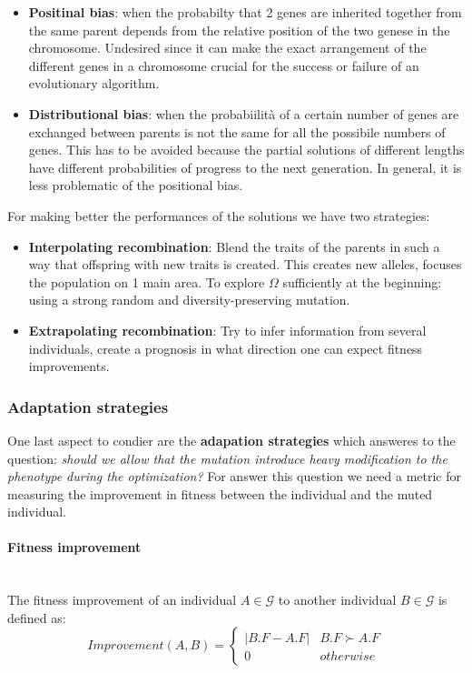 \documentclass{article}
\begin{document}
\begin{itemize}
    \item \textbf{Positinal bias}: when the probabilty that 2 genes are inherited
          together from the same parent depends from the relative position of the two
          genese in the chromosome. Undesired since it can make the exact arrangement of
          the different genes in a chromosome crucial for the
          success or failure of an evolutionary algorithm.

    \item \textbf{Distributional bias}: when the probabiilità of a certain number of
          genes are exchanged between parents is not the same for all the possibile numbers of genes.
          This has to be avoided because the partial solutions of different lengths have
          different probabilities of progress to the next generation. In general, it is less
          problematic of the positional bias.
\end{itemize}
For making better the performances of the solutions we have two strategies:
\begin{itemize}
    \item \textbf{Interpolating recombination}: Blend the traits of the parents in such
          a way that offspring with new traits is created. This creates new alleles, focuses
          the population on 1 main area. To explore $\Omega$ sufficiently at the beginning:
          using a strong random and diversity-preserving mutation.

    \item \textbf{Extrapolating recombination}: Try to infer information from several
          individuals, create a prognosis in what direction one can expect fitness
          improvements.
\end{itemize}

\subsubsection{Adaptation strategies}
One last aspect to condier are the \textbf{adapation strategies} which answeres to the
question: \textit{should we allow that the mutation introduce heavy modification to
    the phenotype during the optimization?} For answer this question we need a metric for
measuring the improvement in fitness between the individual and the muted individual.

\paragraph{Fitness improvement}\mbox{}\\
The fitness improvement of an individual $A\in\mathcal{G}$ to another individual $B\in\mathcal{G}$
is defined as:
\[
    Improvement(A,B)=
    \begin{cases}
        |B.F-A.F| & B.F\succ A.F \\
        0         & otherwise
    \end{cases}
\]
\end{document}
